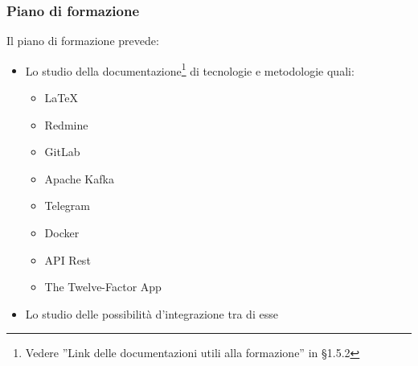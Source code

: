 		\subsubsection{Piano di formazione}
		Il piano di formazione prevede:
		\begin{itemize}
			\item Lo studio della documentazione\footnote{Vedere ''Link delle documentazioni utili alla formazione'' in \S{1.5.2}} di tecnologie e metodologie quali:
			\begin{itemize}
				\item \LaTeX 
				\item Redmine 
				\item GitLab 
				\item Apache Kafka
				\item Telegram 
				\item Docker 
				\item API Rest
				\item The Twelve-Factor App
			\end{itemize}
			\item Lo studio delle possibilità d'integrazione tra di esse
		\end{itemize}
